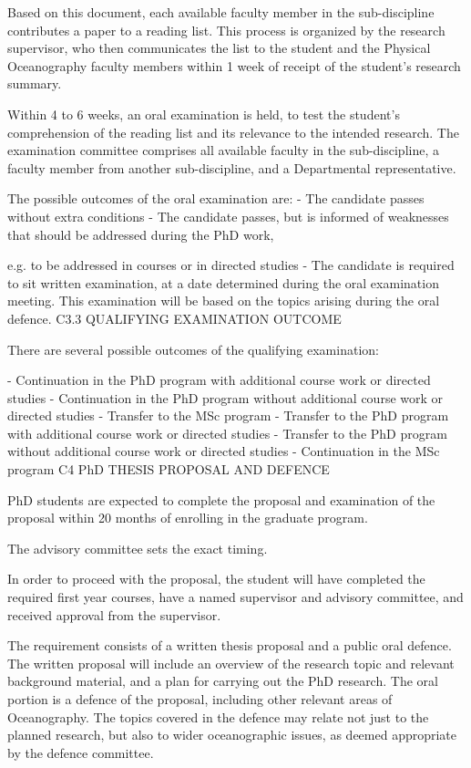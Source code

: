Based on this document, each available faculty member in the sub-discipline contributes a paper to a reading list. This process is organized by the research supervisor, who then communicates the list to the student and the Physical Oceanography faculty members within 1 week of receipt of the student’s research summary.

Within 4 to 6 weeks, an oral examination is held, to test the student’s comprehension of the reading list and its relevance to the intended research. The examination committee comprises all available faculty in the sub-discipline, a faculty member from another sub-discipline, and a Departmental representative.

The possible outcomes of the oral examination are:
-	The candidate passes without extra conditions
-	The candidate passes, but is informed of weaknesses that should be addressed during the PhD work,
 

e.g. to be addressed in courses or in directed studies
-	The candidate is required to sit written examination, at a date determined during the oral examination meeting. This examination will be based on the topics arising during the oral defence.
C3.3	QUALIFYING EXAMINATION OUTCOME

There are several possible outcomes of the qualifying examination:

-	Continuation in the PhD program with additional course work or directed studies
-	Continuation in the PhD program without additional course work or directed studies
-	Transfer to the MSc program
-	Transfer to the PhD program with additional course work or directed studies
-	Transfer to the PhD program without additional course work or directed studies
-	Continuation in the MSc program
C4	PhD THESIS PROPOSAL AND DEFENCE

PhD students are expected to complete the proposal and examination of the proposal within 20 months of enrolling in the graduate program.

The advisory committee sets the exact timing.

In order to proceed with the proposal, the student will have completed the required first year courses, have a named supervisor and advisory committee, and received approval from the supervisor.

The requirement consists of a written thesis proposal and a public oral defence.  The written proposal will include an overview of the research topic and relevant background material, and a plan for carrying out the PhD research. The oral portion is a defence of the proposal, including other relevant areas of Oceanography. The topics covered in the defence may relate not just to the planned research, but also to wider oceanographic issues, as deemed appropriate by the defence committee.

